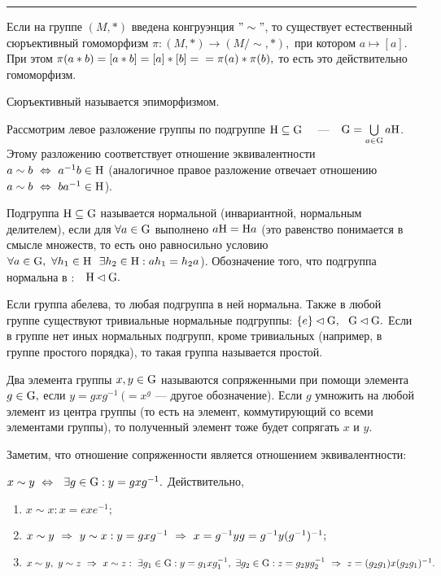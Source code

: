 \smallskip
\hrule
\rule{0pt}{20pt}

Если на группе $(M, *)$ введена конгруэнция $"\sim"$, то существует естественный сюръективный
гомоморфизм $\pi : (M,*)\rightarrow (M/\sim, *),$
при котором $a\mapsto [a].$ При этом $\pi(a*b)=[a*b]=[a]*[b]=\\=\pi(a)*\pi(b),$ то есть это действительно гомоморфизм.
\par\de Сюръективный \г называется эпиморфизмом.
\par Рассмотрим левое разложение группы  по подгруппе ${\rm H}\subseteq{\rm G}$ \ \ ---\ \ ${\rm G}=\bigcup\limits_{a\in{\rm G}}a{\rm H}$. Этому
разложению соответствует отношение эквивалентности $a\sim b\ \Leftrightarrow\  a^{-1}b\in {\rm H}$ (аналогичное правое разложение отвечает отношению $a\sim b\ \Leftrightarrow\  ba^{-1}\in{\rm H}$).
\par\de Подгруппа ${\rm H\subseteq G}$ называется нормальной (инвариантной, нормальным делителем), если для $\forall a\in{\rm G}$ выполнено $a{\rm H}={\rm H}a$ (это равенство понимается в смысле множеств, то есть оно
равносильно условию $\forall a\in\rr{G},\  \forall h_1\in\rr{H}\ \ \exists h_2\in\rr{H} : ah_1=h_2a$). Обозначение того, что подгруппа  нормальна в :\ \ ${\rm H}\lhd{\rm G}.$
\par Если группа абелева, то любая подгруппа в ней нормальна. Также в любой группе существуют тривиальные нормальные подгруппы: $\{e\}\lhd{\rm G},\ \ {\rm G}\lhd{\rm G}.$
Если в группе нет иных нормальных подгрупп, кроме тривиальных (например, в группе простого порядка), то такая группа называется простой.
\par\de Два элемента группы $x,y\in{\rm G}$ называются сопряженными при помощи элемента $g\in{\rm G},$ если $y=gxg^{-1}\ (=x^g$ --- другое обозначение).
Если $g$ умножить на любой элемент из центра группы (то есть на элемент, коммутирующий со всеми элементами группы), то полученный элемент тоже будет сопрягать $x$ и $y$.
\par Заметим, что отношение сопряженности является отношением эквивалентности:
\par $x\sim y \ \Leftrightarrow\  \ \exists g\in{\rm G} : y=gxg^{-1}.$ Действительно,
\begin{enumerate}
    \item $x\sim x : x=exe^{-1};$
    \item $x\sim y\ \Rightarrow\  y\sim x : y=gxg^{-1}\ \Rightarrow\  x=g^{-1}yg=g^{-1}y(g^{-1})^{-1};$
    \item $x\sim y,\ y\sim z\ra x\sim z : \ \exists g_1\in \rr{G} : y=g_1xg_1^{-1},\ \exists g_2\in\rr{G} : z=g_2yg_2^{-1}\ra z=(g_2g_1)x(g_2g_1)^{-1}.$
\end{enumerate}
